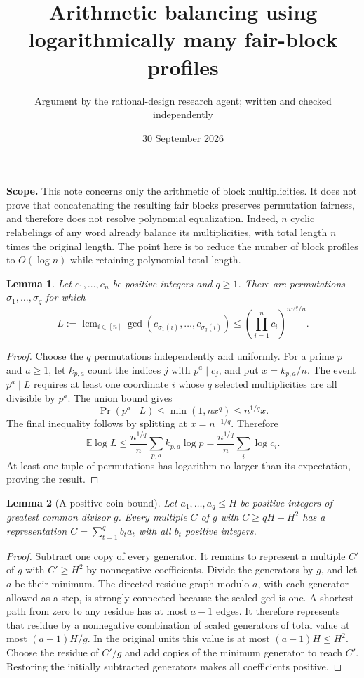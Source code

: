 \documentclass[11pt]{article}
\title{Arithmetic balancing using logarithmically many fair-block profiles}
\author{Argument by the rational-design research agent; written and checked independently}
\date{30 September 2026}
\newtheorem{lemma}{Lemma}
\newcommand{\E}{\mathbb E}
\begin{document}
\maketitle
\noindent\textbf{Scope.} This note concerns only the arithmetic of block
multiplicities. It does not prove that concatenating the resulting
fair blocks preserves permutation fairness, and therefore does not
resolve polynomial equalization. Indeed, $n$ cyclic relabelings of any
word already balance its multiplicities, with total length $n$ times
the original length. The point here is to reduce the number of block
profiles to $O(\log n)$ while retaining polynomial total length.

\begin{lemma}\label{gcd}
Let $c_1,\ldots,c_n$ be positive integers and $q\ge1$. There are
permutations $\sigma_1,\ldots,\sigma_q$ for which
\[
 L:=\operatorname{lcm}_{i\in[n]}
       \gcd(c_{\sigma_1(i)},\ldots,c_{\sigma_q(i)})
 \le\left(\prod_{i=1}^n c_i\right)^{n^{1/q}/n}.
\]
\end{lemma}
\begin{proof}
Choose the $q$ permutations independently and uniformly.
For a prime $p$ and $a\ge1$, let $k_{p,a}$ count the indices $j$
with $p^a\mid c_j$, and put $x=k_{p,a}/n$.
The event $p^a\mid L$ requires at least one coordinate $i$ whose
$q$ selected multiplicities are all divisible by $p^a$.
The union bound gives
\[
 \Pr(p^a\mid L)\le\min(1,nx^q)\le n^{1/q}x.
\]
The final inequality follows by splitting at $x=n^{-1/q}$.
Therefore
\[
 \E\log L
 \le\frac{n^{1/q}}n\sum_{p,a}k_{p,a}\log p
 =\frac{n^{1/q}}n\sum_i\log c_i.
\]
At least one tuple of permutations has logarithm no larger than its
expectation, proving the result.
\end{proof}

\begin{lemma}[A positive coin bound]\label{coin}
Let $a_1,\ldots,a_q\le H$ be positive integers of greatest common
divisor $g$. Every multiple $C$ of $g$ with $C\ge qH+H^2$ has a
representation $C=\sum_{t=1}^q b_ta_t$ with all $b_t$ positive integers.
\end{lemma}
\begin{proof}
Subtract one copy of every generator. It remains to represent a
multiple $C'$ of $g$ with $C'\ge H^2$ by nonnegative coefficients.
Divide the generators by $g$, and let $a$ be their minimum.
The directed residue graph modulo $a$, with each generator allowed
as a step, is strongly connected because the scaled gcd is one.
A shortest path from zero to any residue has at most $a-1$ edges.
It therefore represents that residue by a nonnegative combination
of scaled generators of total value at most $(a-1)H/g$.
In the original units this value is at most $(a-1)H\le H^2$.
Choose the residue of $C'/g$ and add copies of the minimum generator
to reach $C'$. Restoring the initially subtracted generators makes
all coefficients positive.
\end{proof}
\end{document}
